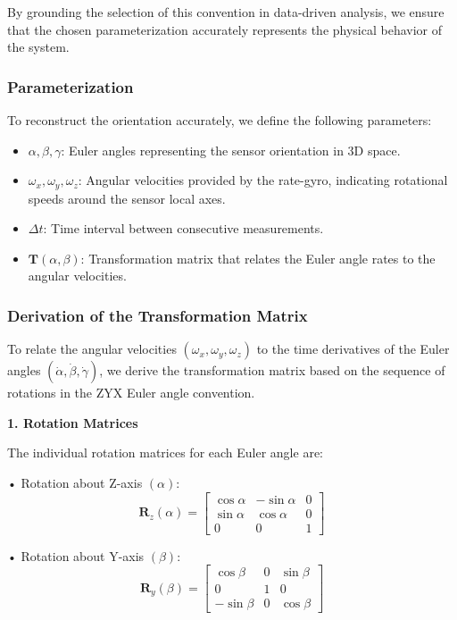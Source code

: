 \documentclass[12pt]{article}
\begin{document}
By grounding the selection of this convention in data-driven analysis, we ensure that the chosen parameterization accurately represents the physical behavior of the system.

\subsubsection{Parameterization}
To reconstruct the orientation accurately, we define the following parameters:
\begin{itemize}
    \item \(\alpha, \beta, \gamma\): Euler angles representing the sensor orientation in 3D space.
    \item \(\omega_x, \omega_y, \omega_z\): Angular velocities provided by the rate-gyro, indicating rotational speeds around the sensor local axes.
    \item \(\Delta t\): Time interval between consecutive measurements.
    \item \(\mathbf{T}(\alpha, \beta)\): Transformation matrix that relates the Euler angle rates to the angular velocities.
\end{itemize}


\subsubsection{Derivation of the Transformation Matrix}

To relate the angular velocities \((\omega_x, \omega_y, \omega_z)\) to the time derivatives of the Euler angles \((\dot{\alpha}, \dot{\beta}, \dot{\gamma})\), we derive the transformation matrix based on the sequence of rotations in the ZYX Euler angle convention.

\vspace{0.5cm}

\textbf{1. Rotation Matrices}

The individual rotation matrices for each Euler angle are:

• Rotation about Z-axis \((\alpha)\):
\begin{equation}
\label{eq:R_z}
\mathbf{R}_z(\alpha) =
\begin{bmatrix}
\cos\alpha & -\sin\alpha & 0 \\
\sin\alpha & \cos\alpha & 0 \\
0 & 0 & 1
\end{bmatrix}
\end{equation}


• Rotation about Y-axis \((\beta)\):
\begin{equation}
\label{eq:R_y}
\mathbf{R}_y(\beta) =
\begin{bmatrix}
\cos\beta & 0 & \sin\beta \\
0 & 1 & 0 \\
-\sin\beta & 0 & \cos\beta
\end{bmatrix}
\end{equation}
\end{document}
